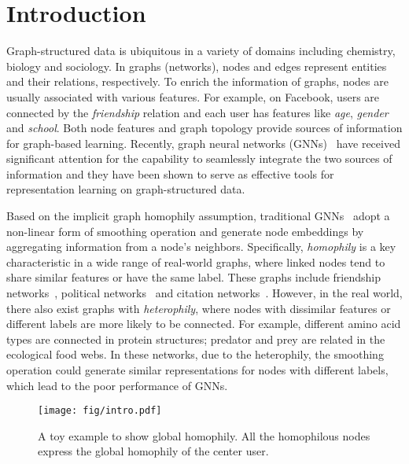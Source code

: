 \documentclass[nohyperref]{article}
\theoremstyle{plain}
\theoremstyle{definition}
\theoremstyle{remark}
\begin{document}
\section{Introduction}
\label{sec:intro}
Graph-structured data is ubiquitous 
in a variety of domains including chemistry, biology and sociology.
In graphs (networks),
nodes and edges represent entities and their relations, respectively. To enrich the information of graphs, 
nodes are usually associated with various features.
For example,
on Facebook,
users are connected by the \emph{friendship} relation and each user has features like \emph{age}, \emph{gender} and \emph{school}.
Both node features and graph topology provide sources of information for graph-based learning.
Recently,
graph neural networks (GNNs)~\cite{kipf2016semi,velivckovic2017graph,hamilton2017inductive}
have received significant attention for the capability to seamlessly integrate the two sources of information
and they have been shown to serve as
effective tools for representation learning on graph-structured data.

Based on the implicit graph homophily assumption,
traditional GNNs~\cite{kipf2016semi}
adopt a non-linear form of smoothing operation and 
generate node embeddings by aggregating information from a node's neighbors.
Specifically,
\emph{homophily} is a key characteristic in a wide range of real-world graphs, 
where linked nodes tend to share similar features or have the same label.
These graphs include friendship networks~\cite{mcpherson2001birds}, political networks~\cite{gerber2013political} and citation networks~\cite{ciotti2016homophily}. 
However, 
in the real world,
there also exist graphs with \emph{heterophily},
where nodes with dissimilar features or different labels are more likely to be connected.
For example,
different amino acid types are connected in protein structures;
predator and prey are related in the ecological food webs.
In these networks,
due to the heterophily,
the smoothing operation could generate similar representations for nodes with different labels,
which lead to the poor performance of 
GNNs. 



\begin{figure}[!htbp]
    \centering
        \texttt{[image: fig/intro.pdf]}
        \caption{A toy example to show global homophily. All the homophilous nodes express the global homophily of the center user.}
        \label{fig:toy}
\end{figure}
\end{document}
